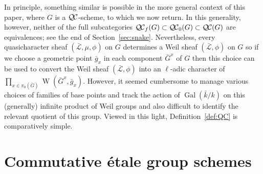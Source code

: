 \documentclass[11pt]{amsart}
\theoremstyle{plain}
\theoremstyle{definition}
\theoremstyle{remark}
\newcommand{\bFq}{\bar{k}}
\newcommand{\Fq}{k}
\DeclareMathOperator{\Gal}{Gal}
\DeclareMathOperator{\W}{W}
\newcommand{\gqcs}[1]{{\mathcal{\bar #1}}}
\newcommand{\QC}{{\mathcal{Q\hskip-0.8pt C}}}
\newcommand{\QCb}{{\QC_0}}
\newcommand{\QCf}{{\QC_f}}
\newcommand{\bG}{\bar{G}}
\begin{document}
In principle, something similar is possible in the more general 
context of this paper, where $G$ is a $\QC$-scheme, to which we now return. 
In this generality, however, neither of the full subcategories $\QCf(G) \subset \QCb(G) \subset \QC(G)$ are equivalences;
see the end of Section~\ref{sec:snake}.
Nevertheless, every quasicharacter sheaf $(\gqcs{L},\mu,\phi)$ on $G$ 
determines a Weil sheaf $(\gqcs{L},\phi)$ on $G$
so if we choose a geometric point ${\bar g}_x$ in each component $\bG^x$ of $G$ 
then this choice can be used to convert 
the Weil sheaf $(\gqcs{L},\phi)$ into an $\ell$-adic character of $\prod_{x\in \pi_0(\bG)}\W(\bG^x, {\bar g}_x)$. 
However, it seemed cumbersome to manage various 
choices of families of base points and track the action 
of $\Gal(\bFq/\Fq)$ on this (generally) infinite product of 
Weil groups and also difficult to identify the relevant quotient of this group.
Viewed in this light, Definition~\ref{def:QC} is comparatively simple.

\section{Commutative \'etale group schemes} \label{sec:etale}
%
\end{document}
